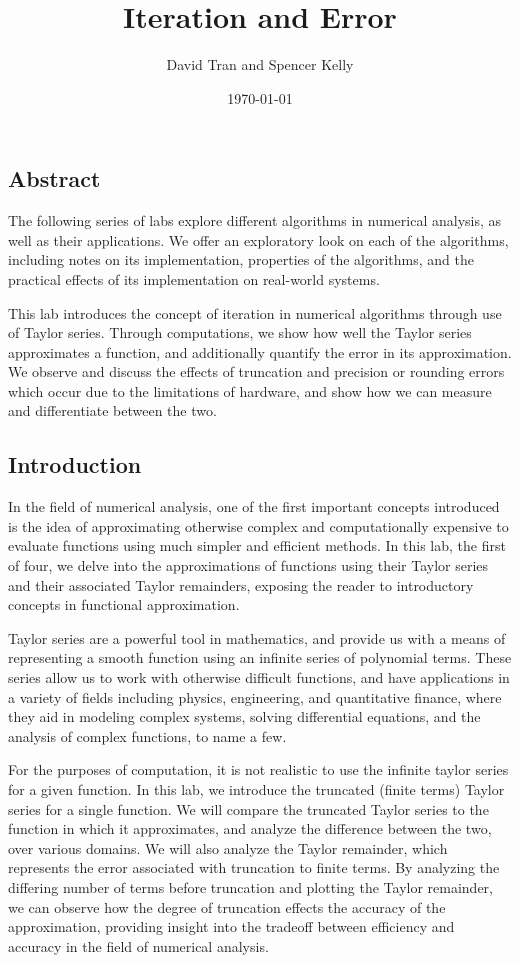 \documentclass[11pt]{article}
\title{Iteration and Error}
\author{David Tran and Spencer Kelly}
\date{\today}
\begin{document}
\maketitle

\subsection*{Abstract}
The following series of labs explore different algorithms in numerical analysis, as well as their applications. We offer an exploratory look on each of the algorithms, including notes on its implementation, properties of the algorithms, and the practical effects of its implementation on real-world systems.

This lab introduces the concept of iteration in numerical algorithms through use of Taylor series. Through computations, we show how well the Taylor series approximates a function, and additionally quantify the error in its approximation. We observe and discuss the effects of truncation and precision or rounding errors which occur due to the limitations of hardware, and show how we can measure and differentiate between the two.

\subsection*{Introduction}
In the field of numerical analysis, one of the first important concepts introduced is the idea of approximating otherwise complex and computationally expensive to evaluate functions using much simpler and efficient methods.
In this lab, the first of four, we delve into the approximations of functions using their Taylor series and their associated Taylor remainders, exposing the reader to introductory concepts in functional approximation.

Taylor series are a powerful tool in mathematics, and provide us with a means of representing a smooth function using an infinite series of polynomial terms.
These series allow us to work with otherwise difficult functions, and have applications in a variety of fields including physics, engineering, and quantitative finance, where they aid in modeling complex systems, solving differential equations, and the analysis of complex functions, to name a few.

For the purposes of computation, it is not realistic to use the infinite taylor series for a given function.
In this lab, we introduce the truncated (finite terms) Taylor series for a single function.
We will compare the truncated Taylor series to the function in which it approximates, and analyze the difference between the two, over various domains.
We will also analyze the Taylor remainder, which represents the error associated with truncation to finite terms.
By analyzing the differing number of terms before truncation and plotting the Taylor remainder, we can observe how the degree of truncation effects the accuracy of the approximation, providing insight into the tradeoff between efficiency and accuracy in the field of numerical analysis.
\end{document}
